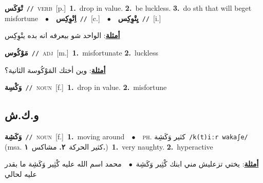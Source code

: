 \documentclass[10pt,a4paper,twoside]{article} %
\begin{document}
\begin{multicols}{2}
{\setlength\topsep{0pt}\textbf{\foreignlanguage{arabic}{تْوَكَس}}\ {\color{gray}\texttt{//}\color{black}}\ \textsc{verb}\ [p.]\ \textbf{1.}~drop in value.  \textbf{2.}~be luckless.  \textbf{3.}~do sth that will beget misfortune\ \ $\bullet$\ \ \setlength\topsep{0pt}\textbf{\foreignlanguage{arabic}{اِتْوِكِس}}\ {\color{gray}\texttt{//}\color{black}}\ [c.]\ \ $\bullet$\ \ \setlength\topsep{0pt}\textbf{\foreignlanguage{arabic}{يِتْوِكِس}}\ {\color{gray}\texttt{//}\color{black}}\ [i.]\  \begin{flushright}\color{gray}\foreignlanguage{arabic}{\textbf{\underline{\foreignlanguage{arabic}{أمثلة}}}: الواحد شو بيعرفه انه بده يتْوِكِس}\end{flushright}\color{black}} \vspace{2mm}

{\setlength\topsep{0pt}\textbf{\foreignlanguage{arabic}{مَوْكُوس}}\ {\color{gray}\texttt{//}\color{black}}\ \textsc{adj}\ [m.]\ \textbf{1.}~misfortunate  \textbf{2.}~luckless\  \begin{flushright}\color{gray}\foreignlanguage{arabic}{\textbf{\underline{\foreignlanguage{arabic}{أمثلة}}}: وين أختك المَوْكُوسة الثانية؟}\end{flushright}\color{black}} \vspace{2mm}

{\setlength\topsep{0pt}\textbf{\foreignlanguage{arabic}{وَكْسِة}}\ {\color{gray}\texttt{//}\color{black}}\ \textsc{noun}\ [f.]\ \textbf{1.}~drop in value.  \textbf{2.}~misfortune\ } \vspace{2mm}

\vspace{-3mm}
\subsection*{\color{blue}\foreignlanguage{arabic}{و.ك.ش}\color{blue}{}} 

{\setlength\topsep{0pt}\textbf{\foreignlanguage{arabic}{وَكَشِة}}\ {\color{gray}\texttt{//}\color{black}}\ \textsc{noun}\ [f.]\ \textbf{1.}~moving around\ \ $\bullet$\ \ \textsc{ph.} \color{gray} \foreignlanguage{arabic}{كثير وَكَشِة}\color{black}\ {\color{gray}\texttt{/{\sffamily k(t)iːr wakaʃe}/}\color{black}}\ \color{gray} (msa. \foreignlanguage{arabic}{كثير الحركة}~\foreignlanguage{arabic}{\textbf{٢.}}  \foreignlanguage{arabic}{مشاكس}~\foreignlanguage{arabic}{\textbf{١.}})\color{black}\ \textbf{1.}~very naughty.  \textbf{2.}~hyperactive\  \begin{flushright}\color{gray}\foreignlanguage{arabic}{\textbf{\underline{\foreignlanguage{arabic}{أمثلة}}}: يختي تزعليش مني ابنك كْثِير وَكَشِة\ $\bullet$\ \  محمد اسم الله عليه كْثِير وَكَشِة ما بقدر عليه لحالي}\end{flushright}\color{black}} \vspace{2mm}


\end{multicols}
\end{document}

